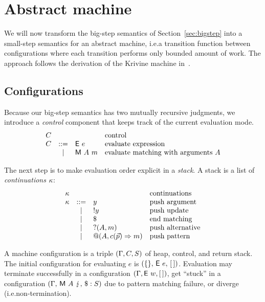 \section{Abstract machine}\label{sec:smallstep}

We will now transform the big-step semantics of
Section~\ref{sec:bigstep} into a small-step semantics for an abstract
machine, i.e.\@ a transition function between configurations where
each transition performs only bounded amount of work. The approach
follows the derivation of the Krivine machine in~\cite{sestof_1997}.

\subsection{Configurations}
Because our big-step semantics has two mutually recursive judgments,
we introduce a \emph{control} component that keeps
track of the current evaluation mode.
\[ \begin{array}{lcll}
     C & && \text{control} \\
     C &::=& \textsf{E}~e & \text{evaluate expression}\\
     &\mid& \textsf{M}~A~m & \text{evaluate matching with arguments}~A 
\end{array} \]

The next step is to make evaluation order explicit 
in a \emph{stack}.  A stack is a list of \emph{continuations} $\kappa$:
\[ \begin{array}{lcll}
     \kappa &&& \text{continuations} \\
     \kappa &::=& y & \text{push argument} \\
           &\mid& !y & \text{push update} \\
           &\mid& \$ & \text{end matching} \\
           &\mid& ?(A,m) & \text{push alternative} \\
           &\mid& @(A,c(\vec{p}) \Rightarrow m) & \text{push pattern}
   \end{array}
   \]

   A machine configuration is a triple $(\Gamma,C,S)$ of heap,
   control, and return stack.  The initial configuration for
   evaluating $e$ is $(\{\},\, \textsf{E}~e,\, [\,])$.  Evaluation may
   terminate successfully in a configuration
   $(\Gamma, \textsf{E}~w, [\,])$, get ``stuck'' in a configuration
   $(\Gamma,\, \textsf{M}~A~\lightning,\, \$:S)$ due to
   pattern matching failure, or diverge (i.e.\@ non-termination).

